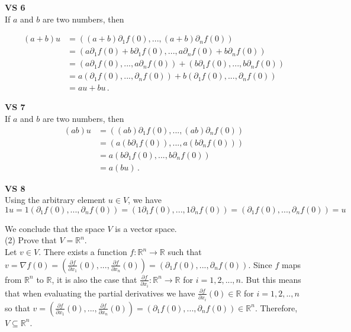 \documentclass[11pt]{article}
\begin{document}
\textbf{VS 6}\\

If $a$ and $b$ are two numbers, then

\begin{align*}
(a+b)u &= ((a+b)\partial_1 f(0),..., (a+b) \partial_n f(0)) \\
&= (a\partial_1 f(0) + b\partial_1 f(0),..., a\partial_n f(0) + b \partial_n f(0))\\
&= (a\partial_1 f(0),...,a\partial_n f(0))+(b\partial_1 f(0),...,b\partial_n f(0))\\
&=a(\partial_1 f(0),...,\partial_n f(0))+b(\partial_1 f(0),...,\partial_n f(0))\\
&= au + bu\,.
\end{align*}

\textbf{VS 7}\\

If $a$ and $b$ are two numbers, then
\begin{align*}
(ab)u &= ((ab)\partial_1 f(0),...,(ab)\partial_n f(0))\\ &= (a(b\partial_1f(0)),...,a(b\partial_n f(0)))\\ &= a(b\partial_1f(0),...,b\partial_n f(0))\\
&= a(bu)\,.
\end{align*}

\textbf{VS 8}\\

Using the arbitrary element $u \in V$, we have
$$1u = 1(\partial_1 f(0),..., \partial_n f(0)) = (1\partial_1 f(0),..., 1\partial_n f(0)) = (\partial_1 f(0),...,\partial_n f(0)) = u$$

We conclude that the space $V$ is a vector space.\\

(2) Prove that $V = \mathbb{R}^n$.\\

Let $v \in V$. There exists a function $f : \mathbb{R}^n \rightarrow \mathbb{R}$ such that $v = \nabla f(0) = (\frac{\partial f}{\partial x_1} (0), ... ,\frac{\partial f}{\partial x_n}(0)) =(\partial_1 f(0),...,\partial_n f(0))$. Since $f$ maps from $\mathbb{R}^n$ to $\mathbb{R}$, it is also the case that $\frac{\partial f}{\partial x_i} : \mathbb{R}^n \rightarrow \mathbb{R}$ for $i = 1,2,...,n$. But this means that when evaluating the partial derivatives we have $\frac{\partial f}{\partial x_i}(0) \in \mathbb{R}$ for $i = 1,2,..,n$ so that $v = (\frac{\partial f}{\partial x_1} (0), ... ,\frac{\partial f}{\partial x_n}(0)) =(\partial_1 f(0),...,\partial_n f(0)) \in \mathbb{R}^n$. Therefore, $V \subseteq \mathbb{R}^n$.\\
\end{document}
